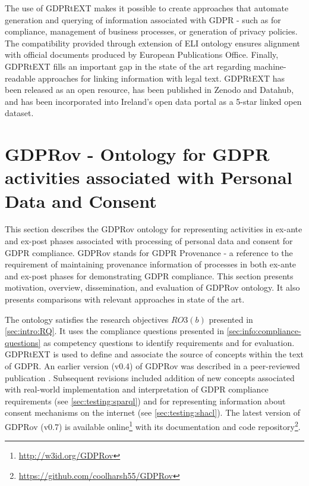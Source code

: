 The use of GDPRtEXT makes it possible to create approaches that automate generation and querying of information associated with GDPR - such as for compliance, management of business processes, or generation of privacy policies. The compatibility provided through extension of ELI ontology ensures alignment with official documents produced by European Publications Office.
Finally, GDPRtEXT fills an important gap in the state of the art regarding machine-readable approaches for linking information with legal text.
GDPRtEXT has been released as an open resource, has been published in Zenodo and Datahub, and has been incorporated into Ireland’s open data portal as a 5-star linked open dataset.

\section{GDPRov - Ontology for GDPR activities associated with Personal Data and Consent}\label{sec:voc:GDPRov}
This section describes the GDPRov ontology for representing activities in ex-ante and ex-post phases associated with processing of personal data and consent for GDPR compliance. GDPRov stands for GDPR Provenance - a reference to the requirement of maintaining provenance information of processes in both ex-ante and ex-post phases for demonstrating GDPR compliance. This section presents motivation, overview, dissemination, and evaluation of GDPRov ontology. It also presents comparisons with relevant approaches in state of the art. 

The ontology satisfies the research objectives $RO3(b)$ presented in \autoref{sec:intro:RQ}.
It uses the compliance questions presented in \autoref{sec:info:compliance-questions} as competency questions to identify requirements and for evaluation.
GDPRtEXT is used to define and associate the source of concepts within the text of GDPR.
An earlier version (v0.4) of GDPRov was described in a peer-reviewed publication \cite{pandit_modelling_2017}.
Subsequent revisions included addition of new concepts associated with real-world implementation and interpretation of GDPR compliance requirements (see \autoref{sec:testing:sparql}) and for representing information about consent mechanisms on the internet (see \autoref{sec:testing:shacl}).
The latest version of GDPRov (v0.7) is available online\footnote{\url{http://w3id.org/GDPRov}} with its documentation and code repository\footnote{\url{https://github.com/coolharsh55/GDPRov}}.

